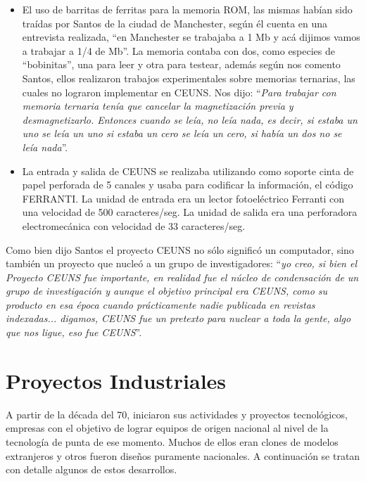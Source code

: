 \documentclass[%
 	final,
%
	notitlepage,
	narroweqnarray,
	inline,
 	twoside,
	]{ieee}
\begin{document}
\begin{itemize}
\item El uso de barritas de ferritas para la memoria ROM, las mismas hab\'ian sido tra\'idas por Santos de la ciudad de Manchester, seg\'un \'el cuenta en una entrevista realizada, ``en Manchester se trabajaba a 1 Mb y ac\'a dijimos vamos a trabajar a 1/4 de Mb''. La memoria contaba con dos, como especies de ``bobinitas'', una para leer y otra para testear, adem\'as seg\'un nos comento Santos, ellos realizaron trabajos experimentales sobre memorias ternarias, las cuales no lograron implementar en CEUNS. Nos dijo: ``\textit{Para trabajar con memoria ternaria ten\'ia que cancelar la magnetizaci\'on previa y desmagnetizarlo. Entonces cuando se le\'ia, no le\'ia nada, es decir, si estaba un uno se le\'ia un uno si estaba un cero se le\'ia un cero, si hab\'ia un dos no se le\'ia nada}''.\\
\item La entrada y salida de CEUNS se realizaba utilizando como soporte cinta de papel perforada de 5 canales y usaba para codificar la informaci\'on, el c\'odigo FERRANTI. La unidad de entrada era un lector fotoel\'ectrico Ferranti con una velocidad de 500 caracteres/seg. La unidad de salida era una perforadora electromec\'anica con velocidad de 33 caracteres/seg.\\
\end{itemize}

Como bien dijo Santos el proyecto CEUNS no s\'olo signific\'o un computador, sino tambi\'en un proyecto que nucle\'o a un grupo de investigadores:
``\textit{yo creo, si bien el Proyecto CEUNS fue importante, en realidad fue el n\'ucleo de condensaci\'on de un grupo de investigaci\'on y aunque el objetivo principal era CEUNS, como su producto en esa \'epoca cuando pr\'acticamente nadie publicada en revistas indexadas... digamos, CEUNS fue un pretexto para nuclear a toda la gente, algo que nos ligue, eso fue CEUNS}''.


\section{Proyectos Industriales}
A partir de la d\'ecada del 70, iniciaron sus actividades y proyectos tecnol\'ogicos, empresas con el objetivo de lograr equipos de origen nacional al nivel de la tecnolog\'ia de punta de ese momento. Muchos de ellos eran clones de modelos extranjeros y otros fueron dise\~nos puramente nacionales.
A continuaci\'on se tratan con detalle algunos de estos desarrollos.
\end{document}
